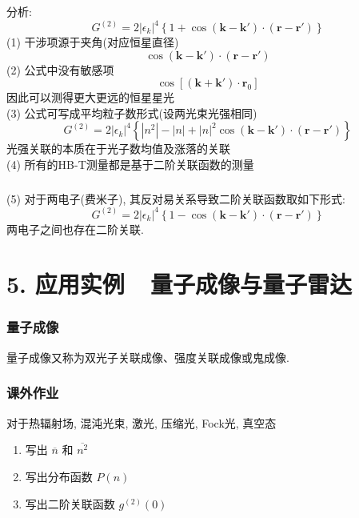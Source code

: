 \begin{frame} 
\frametitle{}
     分析: \\ 
     \[ G^{(2)} = 2 \left|\epsilon_k\right|^4 \left\{ 1+ \cos (\mathbf{k} - \mathbf{k}')\cdot (\mathbf{r}- \mathbf{r}')  \right\}\]
     (1) 干涉项源于夹角(对应恒星直径) \\ 
     \[\cos (\mathbf{k} - \mathbf{k}')\cdot (\mathbf{r}- \mathbf{r}') \]
     (2) 公式中没有敏感项
     \[ \cos\left[ (\mathbf{k} + \mathbf{k}') \cdot \mathbf{r}_0 \right] \]
     因此可以测得更大更远的恒星星光 \\ 
     (3) 公式可写成平均粒子数形式(设两光束光强相同)
     \[ G^{(2)} = 2 \left|\epsilon_k\right|^4 \left\{ \left|n^2\right| - \left|n\right|+ \left| n \right|^2\cos (\mathbf{k} - \mathbf{k}')\cdot (\mathbf{r}- \mathbf{r}')  \right\}\]
     光强关联的本质在于光子数均值及涨落的关联 \\
     (4) 所有的HB-T测量都是基于二阶关联函数的测量
\end{frame}

\begin{frame} 
\frametitle{}
     (5) 对于两电子(费米子), 其反对易关系导致二阶关联函数取如下形式:
     \[ G^{(2)} = 2 \left|\epsilon_k\right|^4 \left\{ 1- \cos (\mathbf{k} - \mathbf{k}')\cdot (\mathbf{r}- \mathbf{r}')  \right\}\]
     两电子之间也存在二阶关联.
\end{frame}

\section{5. 应用实例~~量子成像与量子雷达}

\begin{frame} 
\frametitle{量子成像}
量子成像又称为双光子关联成像、强度关联成像或鬼成像.
\end{frame}
\begin{frame} 
    \frametitle{课外作业}
    对于热辐射场, 混沌光束, 激光, 压缩光, Fock光, 真空态
    \begin{enumerate}
        \item 写出 $\overline{n}$ 和 $\overline{n^2}$
        \item 写出分布函数 $P(n)$
        \item 写出二阶关联函数 $g^{(2)}(0)$
    \end{enumerate}
\end{frame}
